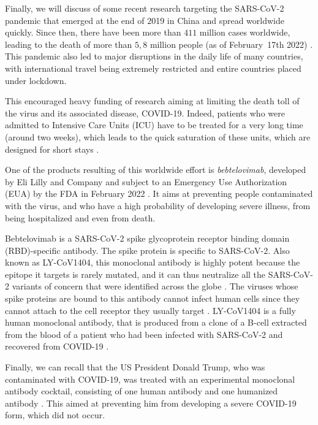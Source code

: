 Finally, we will discuss of some recent research targeting the SARS-CoV-2 pandemic
that emerged at the end of 2019 in China and spread worldwide quickly. Since then, there have
been more than $411$ million cases worldwide, leading to the death of more than $5,8$ million
people (as of February~17th 2022) \cite{noauthor_covid-19_nodate}.
This pandemic also led to major disruptions in the daily
life of many countries, with international travel being extremely restricted and entire 
countries placed under lockdown.

This encouraged heavy funding of research aiming at limiting the death toll of the
virus and its associated disease, COVID-19. Indeed, patients who were admitted to
Intensive Care Units (ICU) have to be treated for a very long time (around two weeks),
which leads to the quick saturation of these units, which are designed for short stays
\cite{mannucci_saturation_2020}.

One of the products resulting of this worldwide effort is \emph{bebtelovimab}, developed
by Eli Lilly and Company and subject to an Emergency Use Authorization (EUA)
by the FDA in February 2022 \cite{office_of_the_commissioner_coronavirus_2022}
\cite{eli_lilly_lillys_2022}. It aims at preventing people contaminated with
the virus, and who have a high probability of developing severe illness, from
being hospitalized and even from death. 

Bebtelovimab is a SARS-CoV-2 spike glycoprotein receptor binding domain
(RBD)-specific antibody. The spike protein is specific to SARS-CoV-2.
Also known as LY-CoV1404, this monoclonal antibody is highly potent because
the epitope it targets is rarely mutated, and it can thus neutralize all the
SARS-CoV-2 variants of concern that were identified across 
the globe \cite{westendorf_ly-cov1404_2022}. The viruses whose spike proteins
are bound to this antibody cannot infect human cells since they cannot attach
to the cell receptor they usually target \cite{wang_sars_2008}.
LY-CoV1404 is a fully human monoclonal antibody, that is produced from a clone
of a B-cell extracted from the blood of a patient who had been infected with
SARS-CoV-2 and recovered from COVID-19 \cite{westendorf_ly-cov1404_2022}.

Finally, we can recall that the US President Donald Trump, who was contaminated
with COVID-19, was treated with an experimental monoclonal antibody cocktail,
consisting of one human antibody and one humanized antibody \cite{cohen_update_2020}. 
This aimed at preventing him from developing a severe COVID-19 form, which did not occur.
